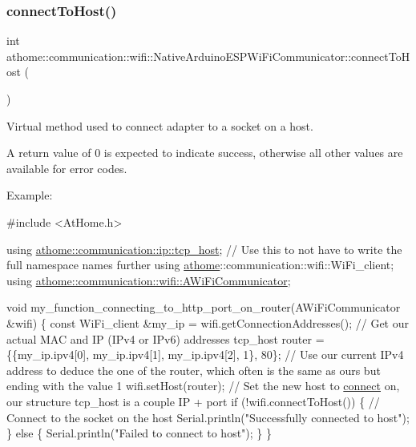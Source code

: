 \subsubsection{\texorpdfstring{connect\+To\+Host()}{connectToHost()}}
{\footnotesize\ttfamily int athome\+::communication\+::wifi\+::\+Native\+Arduino\+E\+S\+P\+Wi\+Fi\+Communicator\+::connect\+To\+Host (\begin{DoxyParamCaption}{ }\end{DoxyParamCaption})\hspace{0.3cm}{\ttfamily [virtual]}}

Virtual method used to connect adapter to a socket on a host.

A return value of 0 is expected to indicate success, otherwise all other values are available for error codes.

Example\+:


\begin{DoxyCode}
\textcolor{preprocessor}{#include <AtHome.h>}

\textcolor{keyword}{using} \mbox{\hyperlink{structathome_1_1communication_1_1ip_1_1s__host}{athome::communication::ip::tcp\_host}}; \textcolor{comment}{// Use this to not have to
       write}
the full \textcolor{keyword}{namespace }names further using
\mbox{\hyperlink{namespaceathome}{athome}}::communication::wifi::WiFi\_client; using
\mbox{\hyperlink{classathome_1_1communication_1_1wifi_1_1_a_wi_fi_communicator}{athome::communication::wifi::AWiFiCommunicator}};

void my\_function\_connecting\_to\_http\_port\_on\_router(AWiFiCommunicator &wifi)
\{ \textcolor{keyword}{const} WiFi\_client &my\_ip = wifi.getConnectionAddresses(); \textcolor{comment}{// Get our}
actual MAC and IP (IPv4 or IPv6) addresses tcp\_host router =
\{\{my\_ip.ipv4[0], my\_ip.ipv4[1], my\_ip.ipv4[2], 1\}, 80\}; \textcolor{comment}{// Use our current}
IPv4 address to deduce the one of the router, which often is the same as
ours but ending with the value 1 wifi.setHost(router); \textcolor{comment}{// Set the new host}
to \mbox{\hyperlink{classathome_1_1communication_1_1wifi_1_1_native_arduino_e_s_p_wi_fi_communicator_abc07f2d953fa91f86b8919858e10bbd7}{connect}} on, our structure tcp\_host is a couple IP + port \textcolor{keywordflow}{if}
(!wifi.connectToHost()) \{ \textcolor{comment}{// Connect to the socket on the host}
    Serial.println(\textcolor{stringliteral}{"Successfully connected to host"});
  \} \textcolor{keywordflow}{else} \{
    Serial.println(\textcolor{stringliteral}{"Failed to connect to host"});
  \}
\}
\end{DoxyCode}
 

